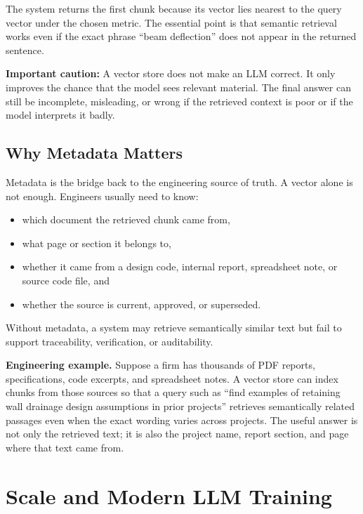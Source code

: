 \documentclass[12pt]{article}
\begin{document}
The system returns the first chunk because its vector lies nearest to the query vector under the chosen metric. The essential point is that semantic retrieval works even if the exact phrase ``beam deflection'' does not appear in the returned sentence.

\begin{alert-box}
\textbf{Important caution:} A vector store does not make an LLM correct. It only improves the chance that the model sees relevant material. The final answer can still be incomplete, misleading, or wrong if the retrieved context is poor or if the model interprets it badly.
\end{alert-box}

\subsection{Why Metadata Matters}

Metadata is the bridge back to the engineering source of truth. A vector alone is not enough. Engineers usually need to know:
\begin{itemize}
    \item which document the retrieved chunk came from,
    \item what page or section it belongs to,
    \item whether it came from a design code, internal report, spreadsheet note, or source code file, and
    \item whether the source is current, approved, or superseded.
\end{itemize}

Without metadata, a system may retrieve semantically similar text but fail to support traceability, verification, or auditability.

\begin{ex-box}
\textbf{Engineering example.} Suppose a firm has thousands of PDF reports, specifications, code excerpts, and spreadsheet notes. A vector store can index chunks from those sources so that a query such as ``find examples of retaining wall drainage design assumptions in prior projects'' retrieves semantically related passages even when the exact wording varies across projects. The useful answer is not only the retrieved text; it is also the project name, report section, and page where that text came from.
\end{ex-box}

\section{Scale and Modern LLM Training}
\end{document}
